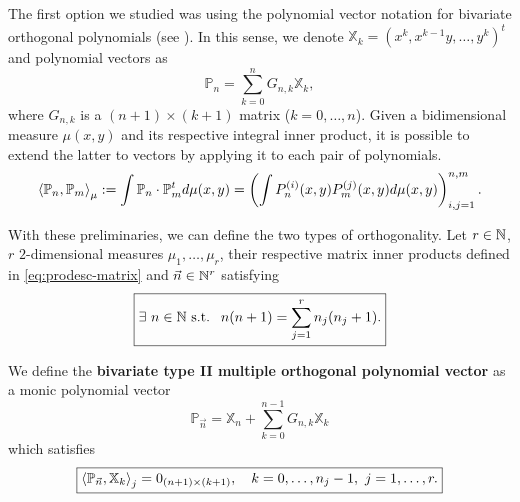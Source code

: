 \documentclass[portrait,final,a0paper,fontscale=0.38]{baposter}
\begin{document}
\begin{poster}
%
	{
  The first option we studied was using the polynomial vector notation for bivariate orthogonal polynomials (see \cite[Ch. III, Section 3.2]{xu}). In this sense, we denote $\mathbb X_k = (x^k, x^{k-1}y,\dots,y^k)^t$ and polynomial vectors as $$\mathbb P_n = \displaystyle\sum_{k=0}^n G_{n,k} \mathbb X_k,$$ where $G_{n,k}$ is a $(n+1)\times(k+1)$ matrix ($k=0,\dots,n$). Given a bidimensional measure $\mu(x,y)$ and its respective integral inner product, it is possible to extend the latter to vectors by applying it to each pair of polynomials.
  \begin{equation}
    \label{eq:prodesc-matrix}
    \left\langle \mathbb P_n , \mathbb P_m \right\rangle_\mu:= \int \mathbb P_n\cdot \mathbb P_m^t d\mu(x,y) = \left(\int P_n^{(i)}(x,y) P_m^{(j)}(x,y) d\mu(x,y)\right)_{i,j=1}^{n,m}.
  \end{equation}

  With these preliminaries, we can define the two types of orthogonality. Let $r\in\mathbb{N}$, $r$ $2$-dimensional measures $\mu_1, \dots, \mu_r$, their respective matrix inner products defined in \eqref{eq:prodesc-matrix} and $\vec n\in\mathbb{N}^r$ satisfying
  \begin{equation}
    \label{eq:condition-type-ii}
    \boxed{\exists \ n\in\mathbb{N} \text{ s.t. } \ n(n+1) = \sum_{j=1}^r n_j (n_j+1).}
  \end{equation}


  \begin{definition}
    We define the \textbf{bivariate type II multiple orthogonal polynomial vector} as a monic polynomial vector $$\mathbb P_{\vec n} = \mathbb X_n + \displaystyle\sum_{k=0}^{n-1}G_{n,k} \mathbb X_k$$ which satisfies
    \begin{equation}
        \label{eq:typeII-MOP-d-variables}
        \boxed{
        \left\langle \mathbb P_{\vec n} , \mathbb X_k \right\rangle_j = 0_{(n+1)\times (k+1)}, \ \ \ k=0,\dots,n_j-1, \ j=1,\dots,r.}
    \end{equation}    
  \end{definition}

}
\end{poster}
\end{document}
